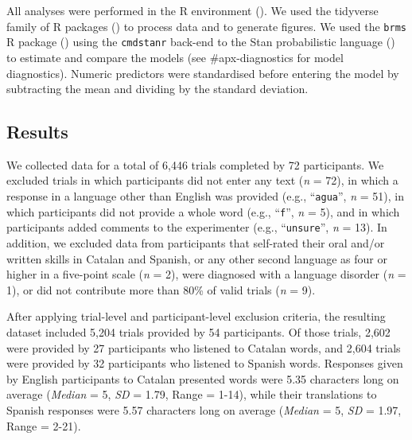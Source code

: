 \documentclass[
  man,
  longtable,
  nolmodern,
  notxfonts,
  notimes,
  colorlinks=true,linkcolor=blue,citecolor=blue,urlcolor=blue]{apa7}
\begin{document}
All analyses were performed in the R environment
(). We used the
tidyverse family of R packages
() to process
data and to generate figures. We used the \texttt{brms} R package
() using the
\texttt{cmdstanr} back-end to the Stan probabilistic language
() to estimate
and compare the models (see \#apx-diagnostics for model diagnostics).
Numeric predictors were standardised before entering the model by
subtracting the mean and dividing by the standard deviation.

\subsection{Results}\label{results}

We collected data for a total of 6,446 trials completed by 72
participants. We excluded trials in which participants did not enter any
text (\emph{n} = 72), in which a response in a language other than
English was provided (e.g., ``\texttt{agua}'', \emph{n} = 51), in which
participants did not provide a whole word (e.g., ``\texttt{f}'',
\emph{n} = 5), and in which participants added comments to the
experimenter (e.g., ``\texttt{unsure}'', \emph{n} = 13). In addition, we
excluded data from participants that self-rated their oral and/or
written skills in Catalan and Spanish, or any other second language as
four or higher in a five-point scale (\emph{n} = 2), were diagnosed with
a language disorder (\emph{n} = 1), or did not contribute more than 80\%
of valid trials (\emph{n} = 9).

After applying trial-level and participant-level exclusion criteria, the
resulting dataset included 5,204 trials provided by 54 participants. Of
those trials, 2,602 were provided by 27 participants who listened to
Catalan words, and 2,604 trials were provided by 32 participants who
listened to Spanish words. Responses given by English participants to
Catalan presented words were 5.35 characters long on average
(\emph{Median} = 5, \emph{SD} = 1.79, Range = 1-14), while their
translations to Spanish responses were 5.57 characters long on average
(\emph{Median} = 5, \emph{SD} = 1.97, Range = 2-21).
\end{document}
